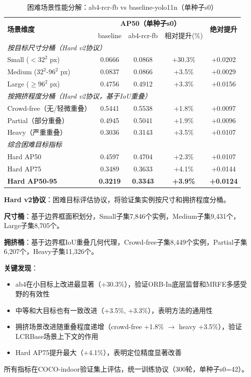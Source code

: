 
\begin{table}[t]
\centering
\caption{困难场景性能分解：ab4-rcr-fb vs baseline-yolo11n（单种子s0）}
\label{tab:hard_breakdown}
\begin{tabular}{l|ccc|c}
\hline
\multirow{2}{*}{\textbf{场景维度}} & \multicolumn{3}{c|}{\textbf{AP50（单种子s0）}} & \multirow{2}{*}{\textbf{绝对提升}} \\
& baseline & ab4-rcr-fb & 相对提升(\%) & \\
\hline
\hline
\multicolumn{5}{l}{\textit{按目标尺寸分桶（Hard v2协议）}} \\
\hline
Small ($< 32^2$ px) & 0.0666 & 0.0868 & +30.3\% & +0.0202 \\
Medium ($32^2$-$96^2$ px) & 0.0837 & 0.0866 & +3.5\% & +0.0029 \\
Large ($\geq 96^2$ px) & 0.4756 & 0.4912 & +3.3\% & +0.0156 \\
\hline
\hline
\multicolumn{5}{l}{\textit{按拥挤程度分桶（Hard v2协议，基于IoU重叠）}} \\
\hline
Crowd-free（无/轻微重叠） & 0.5441 & 0.5538 & +1.8\% & +0.0097 \\
Partial（部分重叠） & 0.4945 & 0.5041 & +1.9\% & +0.0096 \\
Heavy（严重重叠） & 0.3036 & 0.3143 & +3.5\% & +0.0107 \\
\hline
\hline
\multicolumn{5}{l}{\textit{综合困难目标指标}} \\
\hline
Hard AP50 & 0.4597 & 0.4704 & +2.3\% & +0.0107 \\
Hard AP75 & 0.3489 & 0.3633 & +4.1\% & +0.0144 \\
\textbf{Hard AP50-95} & \textbf{0.3219} & \textbf{0.3343} & \textbf{+3.9\%} & \textbf{+0.0124} \\
\hline
\end{tabular}
\begin{tablenotes}
\small
\item \textbf{Hard v2协议}：困难目标评估协议，将验证集实例按尺寸和拥挤程度分桶。
\item \textbf{尺寸桶}：基于边界框面积划分，Small子集7,846个实例，Medium子集9,431个，Large子集8,705个。
\item \textbf{拥挤桶}：基于边界框IoU重叠几何代理，Crowd-free子集8,449个实例，Partial子集6,207个，Heavy子集11,326个。
\item \textbf{关键发现}：
  \begin{itemize}
    \item ab4在小目标上改进最显著（+30.3\%），验证ORB-In底层监督和MRFE多感受野的有效性
    \item 中等和大目标也有一致改进（+3.5\%, +3.3\%），表明方法的通用性
    \item 拥挤场景改进随重叠程度递增（crowd-free +1.8\% $\rightarrow$ heavy +3.5\%），验证LCRBase场景上下文的作用
    \item Hard AP75提升最大（+4.1\%），表明定位精度显著改善
  \end{itemize}
\item 所有指标在COCO-indoor验证集上评估，统一训练协议（300轮，单种子s0=42）。
\end{tablenotes}
\end{table}

